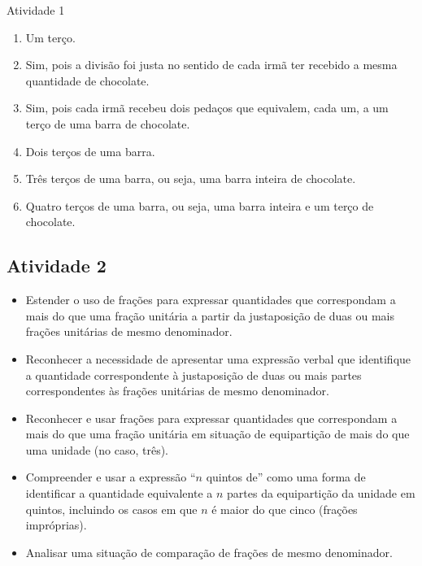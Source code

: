 \begin{multicols}{2}
\begin{resposta*}{Atividade 1}
\begin{enumerate} [\quad a)] %
    \item       Um terço.
    \item       Sim, pois a divisão foi justa no sentido de cada irmã ter recebido a mesma quantidade de chocolate.
    \item       Sim, pois cada irmã recebeu dois pedaços que equivalem, cada um, a um terço de uma barra de chocolate.
    \item       Dois terços de uma barra.
    \item       Três terços de uma barra, ou seja, uma barra inteira de chocolate.
    \item       Quatro terços de uma barra, ou seja, uma barra inteira e um terço de chocolate.
\end{enumerate} %

\end{resposta*}

\newpage
\subsection{Atividade 2}

   \vspace{.1cm}

  \begin{itemize} %
    \item       Estender o uso de frações para expressar quantidades que correspondam a mais do que uma fração unitária  a partir da justaposição de duas ou mais frações unitárias de mesmo denominador.
    \item       Reconhecer a necessidade de apresentar uma expressão verbal que identifique a quantidade correspondente à justaposição de duas ou mais partes correspondentes às frações unitárias de mesmo denominador.
    \item       Reconhecer e usar frações para expressar quantidades que correspondam a mais do que uma fração unitária em situação de equipartição de mais do que uma unidade (no caso, três).
    \item       Compreender e usar a expressão       ``$n$ quintos de''     como uma forma de identificar a quantidade equivalente a       $n$ partes da equipartição da unidade em quintos, incluindo os casos em que       $n$ é maior do que cinco (frações impróprias).
    \item       Analisar uma situação de comparação de frações de mesmo denominador.
\end{itemize} %



\end{multicols}
